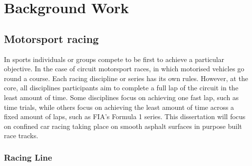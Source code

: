 \section{Background Work}

\subsection{Motorsport racing}

In sports individuals or groups compete to be first to achieve a particular objective. In the case of circuit motorsport races, in which motorised vehicles go round a course. Each racing discipline or series has its own rules. However, at the core, all disciplines participants aim to complete a full lap of the circuit in the least amount of time. Some disciplines focus on achieving one fast lap, such as time trials, while others focus on achieving the least amount of time across a fixed amount of laps, such as FIA's Formula 1 series. This dissertation will focus on confined car racing taking place on smooth asphalt surfaces in purpose built race tracks. 

\subsubsection{Racing Line}

